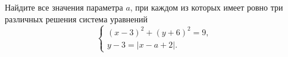 \begin{ex}
	\begin{condition}
		Найдите все значения параметра \( a \), при каждом из которых имеет ровно три различных решения система уравнений
		\[ \left\{
		\begin{array}{l}
			(x-3)^2+(y+6)^2=9,\\
			y-3=|x-a+2|.
		\end{array}
		\right. \]
	\end{condition}
\end{ex}